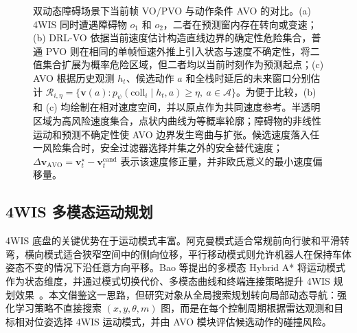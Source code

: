 \documentclass[UTF8,10pt,a4paper,twocolumn]{ctexart}
\begin{document}
\begin{figure}[t]
{}
\fi
    \caption{双动态障碍场景下当前帧 VO/PVO 与动作条件 AVO 的对比。(a) 4WIS 同时遭遇障碍物 $o_1$ 和 $o_2$，二者在预测窗内存在转向或变速；(b) DRL-VO 依据当前速度估计构造直线边界的确定性危险集合，普通 PVO 则在相同的单帧恒速外推上引入状态与速度不确定性，将二值集合扩展为概率危险区域，但二者均以当前时刻作为预测起点；(c) AVO 根据历史观测 $h_t$、候选动作 $a$ 和全栈时延后的未来窗口分别估计 $\mathcal R_{i,\eta}=\{\mathbf v(a):p_{\psi}(\mathrm{coll}_i\mid h_t,a)\ge\eta,\ a\in\mathcal A\}$。为便于比较，(b) 和 (c) 均绘制在相对速度空间，并以原点作为共同速度参考。半透明区域为高风险速度集合，点状内曲线为等概率轮廓；障碍物的非线性运动和预测不确定性使 AVO 边界发生弯曲与扩张。候选速度落入任一风险集合时，安全过滤器选择并集之外的安全替代速度；$\Delta\mathbf v_{\mathrm{AVO}}=\mathbf v_t^{\star}-\mathbf v_t^{\mathrm{cand}}$ 表示该速度修正量，并非欧氏意义的最小速度偏移量。}
    \label{fig:curved_pvo_cone}
\end{figure}

\subsection{4WIS 多模态运动规划}

4WIS 底盘的关键优势在于运动模式丰富。阿克曼模式适合常规前向行驶和平滑转弯，横向模式适合狭窄空间中的侧向位移，平行移动模式则允许机器人在保持车体姿态不变的情况下沿任意方向平移。Bao 等提出的多模态 Hybrid A* 将运动模式作为状态维度，并通过模式切换代价、多模态曲线和终端连接策略提升 4WIS 规划效果~\cite{bao2025hybrid}。本文借鉴这一思路，但研究对象从全局搜索规划转向局部动态导航：强化学习策略不直接搜索 $(x,y,\theta,m)$ 图，而是在每个控制周期根据雷达观测和目标相对位姿选择 4WIS 运动模式，并由 AVO 模块评估候选动作的碰撞风险。
\end{document}
